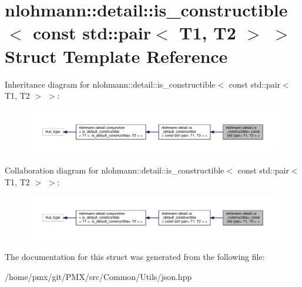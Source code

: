 \hypertarget{structnlohmann_1_1detail_1_1is__constructible_3_01const_01std_1_1pair_3_01T1_00_01T2_01_4_01_4}{}\section{nlohmann\+:\+:detail\+:\+:is\+\_\+constructible$<$ const std\+:\+:pair$<$ T1, T2 $>$ $>$ Struct Template Reference}
\label{structnlohmann_1_1detail_1_1is__constructible_3_01const_01std_1_1pair_3_01T1_00_01T2_01_4_01_4}


Inheritance diagram for nlohmann\+:\+:detail\+:\+:is\+\_\+constructible$<$ const std\+:\+:pair$<$ T1, T2 $>$ $>$\+:
\nopagebreak
\begin{figure}[H]
\begin{center}
\leavevmode
\includegraphics[width=350pt]{structnlohmann_1_1detail_1_1is__constructible_3_01const_01std_1_1pair_3_01T1_00_01T2_01_4_01_4__inherit__graph}
\end{center}
\end{figure}


Collaboration diagram for nlohmann\+:\+:detail\+:\+:is\+\_\+constructible$<$ const std\+:\+:pair$<$ T1, T2 $>$ $>$\+:
\nopagebreak
\begin{figure}[H]
\begin{center}
\leavevmode
\includegraphics[width=350pt]{structnlohmann_1_1detail_1_1is__constructible_3_01const_01std_1_1pair_3_01T1_00_01T2_01_4_01_4__coll__graph}
\end{center}
\end{figure}


The documentation for this struct was generated from the following file\+:\begin{DoxyCompactItemize}
\item 
/home/pmx/git/\+P\+M\+X/src/\+Common/\+Utils/json.\+hpp\end{DoxyCompactItemize}
